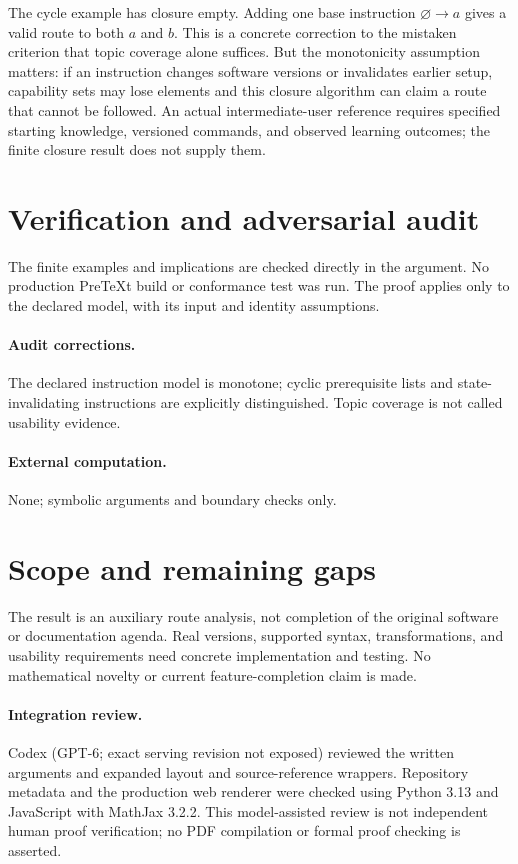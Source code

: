 \documentclass[11pt]{article}
\begin{document}
The cycle example has closure empty. Adding one base instruction $\varnothing\to a$ gives a valid route to both $a$ and $b$. This is a concrete correction to the mistaken criterion that topic coverage alone suffices. But the monotonicity assumption matters: if an instruction changes software versions or invalidates earlier setup, capability sets may lose elements and this closure algorithm can claim a route that cannot be followed. An actual intermediate-user reference requires specified starting knowledge, versioned commands, and observed learning outcomes; the finite closure result does not supply them.
\section{Verification and adversarial audit}
The finite examples and implications are checked directly in the argument. No production PreTeXt build or conformance test was run. The proof applies only to the declared model, with its input and identity assumptions.
\paragraph{Audit corrections.} The declared instruction model is monotone; cyclic prerequisite lists and state-invalidating instructions are explicitly distinguished. Topic coverage is not called usability evidence.
\paragraph{External computation.} None; symbolic arguments and boundary checks only.
\section{Scope and remaining gaps}
The result is an auxiliary route analysis, not completion of the original software or documentation agenda. Real versions, supported syntax, transformations, and usability requirements need concrete implementation and testing. No mathematical novelty or current feature-completion claim is made.
\paragraph{Integration review.} Codex (GPT-6; exact serving revision not exposed) reviewed the written arguments and expanded layout and source-reference wrappers. Repository metadata and the production web renderer were checked using Python 3.13 and JavaScript with MathJax 3.2.2. This model-assisted review is not independent human proof verification; no PDF compilation or formal proof checking is asserted.
\end{document}
